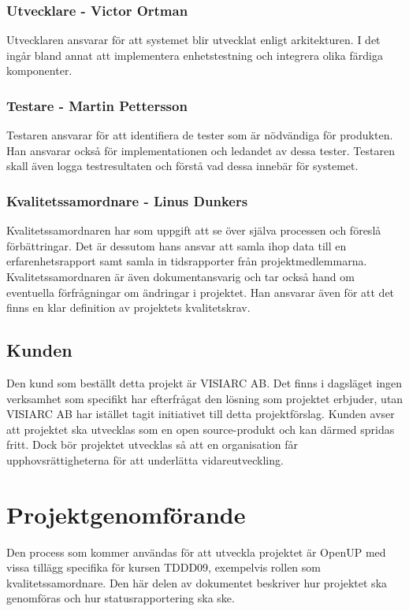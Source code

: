 \subsubsection*{Utvecklare - Victor Ortman}
Utvecklaren ansvarar för att systemet blir utvecklat enligt arkitekturen. I det ingår bland annat att implementera enhetstestning och integrera olika färdiga komponenter.

\subsubsection*{Testare - Martin Pettersson}
Testaren ansvarar för att identifiera de tester som är nödvändiga för produkten. Han ansvarar också för implementationen och ledandet av dessa tester. Testaren skall även logga testresultaten och förstå vad dessa innebär för systemet.

\subsubsection*{Kvalitetssamordnare - Linus Dunkers}
Kvalitetssamordnaren har som uppgift att se över själva processen och föreslå förbättringar. Det är dessutom hans ansvar att samla ihop data till en erfarenhetsrapport samt samla in tidsrapporter från projektmedlemmarna. Kvalitetssamordnaren är även dokumentansvarig och tar också hand om eventuella förfrågningar om ändringar i projektet. Han ansvarar även för att det finns en klar definition av projektets kvalitetskrav.

\subsection{Kunden}
Den kund som beställt detta projekt är VISIARC AB. Det finns i dagsläget ingen verksamhet som specifikt har efterfrågat den lösning som projektet erbjuder, utan VISIARC AB har istället tagit initiativet till detta projektförslag. Kunden avser att projektet ska utvecklas som en open source-produkt och kan därmed spridas fritt. Dock bör projektet utvecklas så att en organisation får upphovsrättigheterna för att underlätta vidareutveckling.

\section{Projektgenomförande}
Den process som kommer användas för att utveckla projektet är OpenUP\cite{openup} med vissa tillägg specifika för kursen TDDD09, exempelvis rollen som kvalitetssamordnare\cite{sandahl}. Den här delen av dokumentet beskriver hur projektet ska genomföras och hur statusrapportering ska ske.

